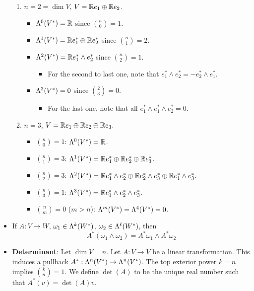 \documentclass[../notes.tex]{subfiles}
\begin{document}
\begin{itemize}
\begin{enumerate}
        \item $n=2=\dim V$, $V=\R e_1\oplus\R e_2$.
        \begin{itemize}
            \item $\lam[0]{V^*}=\R$ since $\binom{n}{0}=1$.
            \item $\lam[1]{V^*}=\R e_1^*\oplus\R e_2^*$ since $\binom{n}{1}=2$.
            \item $\lam[2]{V^*}=\R e_1^*\wedge e_2^*$ since $\binom{n}{2}=1$.
            \begin{itemize}
                \item For the second to last one, note that $e_1^*\wedge e_2^*=-e_2^*\wedge e_1^*$.
            \end{itemize}
            \item $\lam[3]{V^*}=0$ since $\binom{2}{3}=0$.
            \begin{itemize}
                \item For the last one, note that all $e_1^*\wedge e_1^*\wedge e_2^*=0$.
            \end{itemize}
        \end{itemize}
        \item $n=3$, $V=\R e_1\oplus\R e_2\oplus\R e_3$.
        \begin{itemize}
            \item $\binom{n}{0}=1$: $\lam[0]{V^*}=\R$.
            \item $\binom{n}{1}=3$: $\lam[1]{V^*}=\R e_1^*\oplus\R e_2^*\oplus\R e_3^*$.
            \item $\binom{n}{2}=3$: $\lam[2]{V^*}=\R e_1^*\wedge e_2^*\oplus\R e_2^*\wedge e_3^*\oplus\R e_1^*\wedge e_3^*$.
            \item $\binom{n}{3}=1$: $\lam[3]{V^*}=\R e_1^*\wedge e_2^*\wedge e_3^*$.
            \item $\binom{n}{m}=0$ ($m>n$): $\lam[m]{V^*}=\lam[4]{V^*}=0$.
        \end{itemize}
    \end{enumerate}
    \item If $A:V\to W$, $\omega_1\in\lam[k]{W^*}$, $\omega_2\in\lam[\ell]{W^*}$, then
    \begin{equation*}
        A^*(\omega_1\wedge\omega_2) = A^*\omega_1\wedge A^*\omega_2
    \end{equation*}
    \item \textbf{Determinant}: Let $\dim V=n$. Let $A:V\to V$ be a linear transformation. This induces a pullback $A^*:\lam[n]{V^*}\to\lam[n]{V^*}$. The top exterior power $k=n$ implies $\binom{k}{n}=1$. We define $\det(A)$ to be the unique real number such that $A^*(v)=\det(A)v$.

\end{itemize}
\end{document}
